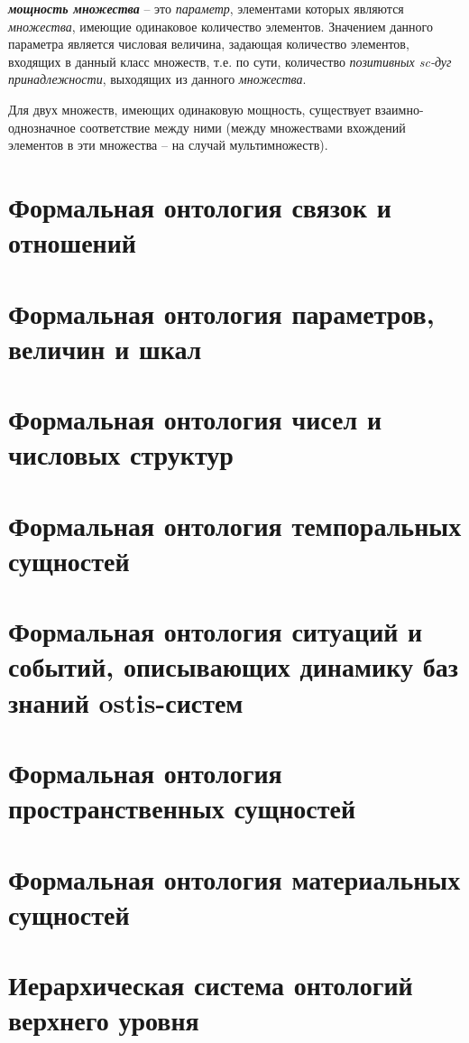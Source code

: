 \textbf{\textit{мощность множества}} – это \textit{параметр}, элементами которых являются \textit{множества}, имеющие одинаковое количество элементов. Значением данного параметра является числовая величина, задающая количество элементов, входящих в данный класс множеств, т.е. по сути, количество \textit{позитивных sc-дуг принадлежности}, выходящих из данного \textit{множества}.
	
	Для двух множеств, имеющих одинаковую мощность, существует взаимно-однозначное соответствие между ними (между множествами вхождений элементов в эти множества – на случай мультимножеств).

\section{Формальная онтология связок и отношений}
\section{Формальная онтология параметров, величин и шкал}
\section{Формальная онтология чисел и числовых структур}
\section{Формальная онтология темпоральных сущностей}
\section{Формальная онтология ситуаций и событий, описывающих динамику баз знаний ostis-систем}
\section{Формальная онтология пространственных сущностей}
\section{Формальная онтология материальных сущностей}
\section{Иерархическая система онтологий верхнего уровня}

%
